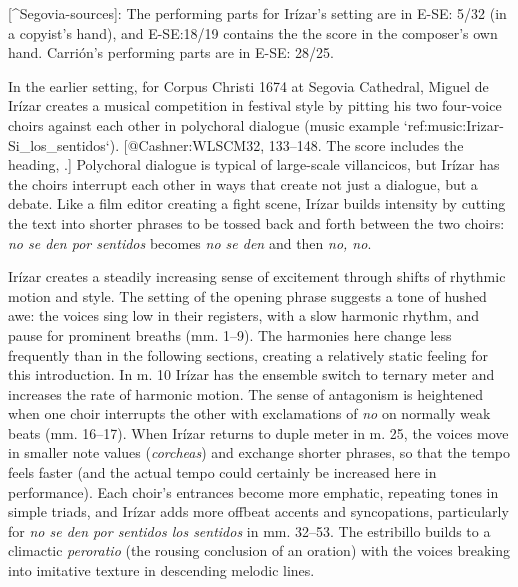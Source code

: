 [^Segovia-sources]:  The performing parts for Irízar's setting are in E-SE: 5/32 (in a copyist's hand), and E-SE:18/19 contains the the score in the composer's own hand.
Carrión's performing parts are in E-SE: 28/25.

In the earlier setting, for Corpus Christi 1674 at Segovia Cathedral, Miguel de Irízar creates a musical competition in festival style by pitting his two four-voice choirs against each other in polychoral dialogue (music example `ref:music:Irizar-Si_los_sentidos`).
[@Cashner:WLSCM32, 133--148.
The score includes the heading, .]
Polychoral dialogue is typical of large-scale villancicos, but Irízar has the choirs interrupt each other in ways that create not just a dialogue, but a debate.
Like a film editor creating a fight scene, Irízar builds intensity by cutting the text into shorter phrases to be tossed back and forth between the two choirs: \emph{no se den por sentidos} becomes \emph{no se den} and then \emph{no, no}.


\label{music:Irizar-Si_los_sentidos}

Irízar creates a steadily increasing sense of excitement through shifts of rhythmic motion and style.
The setting of the opening phrase suggests a tone of hushed awe: the voices sing low in their registers, with a slow harmonic rhythm, and pause for prominent breaths (mm. 1--9).
The harmonies here change less frequently than in the following sections, creating a relatively static feeling for this introduction.
In m. 10 Irízar has the ensemble switch to ternary meter and increases the rate of harmonic motion.
The sense of antagonism is heightened when one choir interrupts the other with exclamations of \emph{no} on normally weak beats (mm. 16--17).
When Irízar returns to duple meter in m. 25, the voices move in smaller note values (\emph{corcheas}) and exchange shorter phrases, so that the tempo feels faster (and the actual tempo could certainly be increased here in performance).
Each choir's entrances become more emphatic, repeating tones in simple triads, and Irízar adds more offbeat accents and syncopations, particularly for \emph{no se den por sentidos los sentidos} in mm. 32--53.
The estribillo builds to a climactic \emph{peroratio} (the rousing conclusion of an oration) with the voices breaking into imitative texture in descending melodic lines.

